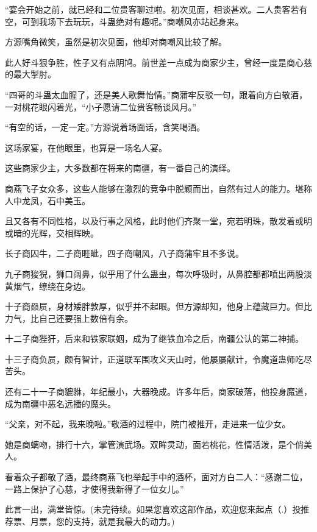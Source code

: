 \begin{this_body}
“宴会开始之前，就已经和二位贵客聊过啦。初次见面，相谈甚欢。二人贵客若有空，可到我场下去玩玩，斗蛊绝对有趣呢。”商嘲风亦站起身来。

方源嘴角微笑，虽然是初次见面，他却对商嘲风比较了解。

此人好斗狠争胜，性子又有点阴鸠。前世差一点成为商家少主，曾经一度是商心慈的最大掣肘。

“四哥的斗蛊太血腥了，还是美人歌舞怡情。”商蒲牢反驳一句，跟着向方白敬酒，一对桃花眼闪着光，“小子愿请二位贵客畅谈风月。”

“有空的话，一定一定。”方源说着场面话，含笑喝酒。

这场家宴，在他眼里，也算是一场名人宴。

这些商家少主，大多数都在将来的南疆，有一番自己的演绎。

商燕飞子女众多，这些人能够在激烈的竞争中脱颖而出，自然有过人的能力。堪称人中龙凤，石中美玉。

且又各有不同性格，以及行事之风格，此时他们齐聚一堂，宛若明珠，散发着或明或暗的光辉，交相辉映。

长子商囚牛，二子商睚眦，四子商嘲风，八子商蒲牢且不多说。

九子商狻猊，狮口阔鼻，似乎用了什么蛊虫，每次呼吸时，从鼻腔都都喷出两股淡黄烟气，缭绕在身边。

十子商赑屃，身材矮胖敦厚，似乎并不起眼。但方源却知，他身上蕴藏巨力。但比力气，比自己还要强上数倍有余。

十二子商狴犴，后来和铁家联姻，成为了继铁血冷之后，南疆公认的第二神捕。

十三子商负屃，颇有智计，正道联军围攻义天山时，他屡屡献计，令魔道蛊师吃尽苦头。

还有二十一子商貔貅，年纪最小，大器晚成。许多年后，商家破落，他投身魔道，成为南疆中恶名远播的魔头。

“父亲，对不起，我来晚啦。”敬酒的过程中，院门被推开，走进来一位少女。

她是商螭吻，排行十六，掌管演武场。双眸灵动，面若桃花，性情活泼，是个俏美人。

看着众子都敬了酒，最终商燕飞也举起手中的酒杯，面对方白二人：“感谢二位，一路上保护了心慈，才使得我新得了一位女儿。”

此言一出，满堂皆惊。(未完待续。如果您喜欢这部作品，欢迎您来起点（.）投推荐票、月票，您的支持，就是我最大的动力。)

\end{this_body}

